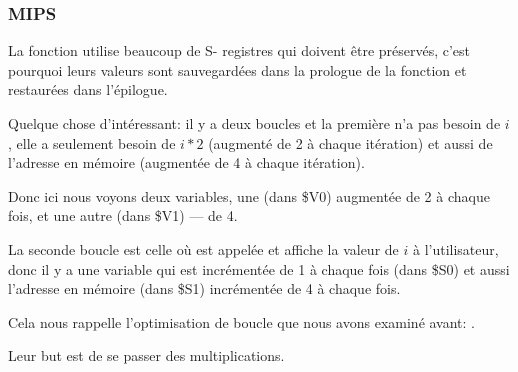 ﻿\subsubsection{MIPS}

La fonction utilise beaucoup de S- registres qui doivent être préservés, c'est pourquoi
leurs valeurs sont sauvegardées dans la prologue de la fonction et restaurées dans
l'épilogue.



Quelque chose d'intéressant: il y a deux boucles et la première n'a pas besoin de
$i$, elle a seulement besoin de $i*2$ (augmenté de 2 à chaque itération) et aussi
de l'adresse en mémoire (augmentée de 4 à chaque itération).

Donc ici nous voyons deux variables, une (dans \$V0) augmentée de 2 à chaque fois,
et une autre (dans \$V1) --- de 4.

La seconde boucle est celle où \printf est appelée et affiche la valeur de $i$ à
l'utilisateur, donc il y a une variable qui est incrémentée de 1 à chaque fois (dans
\$S0) et aussi l'adresse en mémoire (dans \$S1) incrémentée de 4 à chaque fois.

Cela nous rappelle l'optimisation de boucle que nous avons examiné avant: .

Leur but est de se passer des multiplications.

